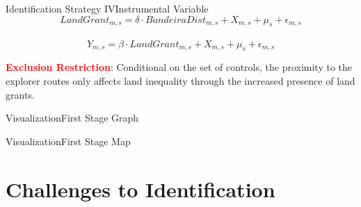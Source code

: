 \documentclass[aspectratio=1610]{beamer}
\begin{document}
\begin{frame}{Identification Strategy IV}{Instrumental Variable}
    \begin{equation}
        \label{eqn:firststage}
        LandGrant_{m,s} = \delta \cdot BandeiraDist_{m,s} +  X_{m,s} + \mu_s  + \epsilon_{m,s}
      \end{equation}

      \begin{equation}
        \label{eqn:ivequation}
        Y_{m,s} = \beta \cdot \widehat{LandGrant}_{m,s} + X_{m,s} + \mu_s +  \epsilon_{m,s}
      \end{equation}

    \vspace{2mm}
      
    \begin{outline}
        \1 \textcolor{red}{\textbf{Exclusion Restriction}}: Conditional on the set of controls, the proximity to the explorer routes only affects land inequality through the increased presence of land grants.
    \end{outline}
\end{frame}

\begin{frame}{Visualization}{First Stage Graph}
    \begin{figure}[h!]
        \begin{center}
        \end{center}
      \end{figure}
\end{frame}

\begin{frame}{Visualization}{First Stage Map}
    \begin{figure}[h!]
        \begin{center}
        \end{center}
      \end{figure}
\end{frame}

\section{Challenges to Identification}
\end{document}
